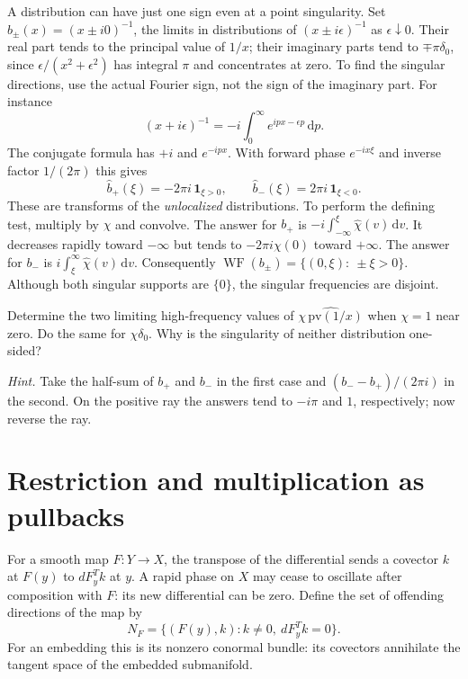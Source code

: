 A distribution can have just one sign even at a point singularity.
Set $b_\pm(x)=(x\pm i0)^{-1}$, the limits in distributions of
$(x\pm i\epsilon)^{-1}$ as $\epsilon\downarrow0$. Their real part tends
to the principal value of $1/x$; their imaginary parts tend to
$\mp\pi\delta_0$, since $\epsilon/(x^2+\epsilon^2)$ has integral $\pi$
and concentrates at zero. To find the singular directions, use the actual
Fourier sign, not the sign of the imaginary part. For instance
\[
  (x+i\epsilon)^{-1}=-i\int_0^\infty e^{ipx-\epsilon p}\,\mathrm{d}p.
\]
The conjugate formula has $+i$ and $e^{-ipx}$. With forward phase
$e^{-ix\xi}$ and inverse factor $1/(2\pi)$ this gives
\begin{equation}
 \widehat b_+(\xi)=-2\pi i\,\mathbf 1_{\xi>0},\qquad
 \widehat b_-(\xi)= 2\pi i\,\mathbf 1_{\xi<0} .
 \label{f:wf-bv}
\end{equation}
These are transforms of the \emph{unlocalized} distributions. To perform
the defining test, multiply by $\chi$ and convolve. The answer for $b_+$
is $-i\int_{-\infty}^\xi\widehat\chi(v)\,\mathrm{d}v$. It decreases
rapidly toward $-\infty$ but tends to $-2\pi i\chi(0)$ toward $+\infty$.
The answer for $b_-$ is $i\int_\xi^\infty\widehat\chi(v)\,\mathrm{d}v$.
Consequently $\operatorname{WF}(b_\pm)=\{(0,\xi):\ \pm\xi>0\}$. Although
both singular supports are $\{0\}$, the singular frequencies are disjoint.

\begin{exercise}
Determine the two limiting high-frequency values of
$\widehat{\chi\,\mathrm{pv}(1/x)}$ when $\chi=1$ near zero. Do the same
for $\chi\delta_0$. Why is the singularity of neither distribution
one-sided?
\end{exercise}
\noindent\emph{Hint.} Take the half-sum of $b_+$ and $b_-$ in the first
case and $(b_--b_+)/(2\pi i)$ in the second. On the positive ray the
answers tend to $-i\pi$ and $1$, respectively; now reverse the ray.

\section{Restriction and multiplication as pullbacks}
For a smooth map $F:Y\to X$, the transpose of the differential sends a
covector $k$ at $F(y)$ to $dF_y^T k$ at $y$. A rapid phase on $X$ may
cease to oscillate after composition with $F$: its new differential can
be zero. Define the set of offending directions of the map by
\[
 N_F=\{(F(y),k):k\ne0,\ dF_y^Tk=0\}.
\]
For an embedding this is its nonzero conormal bundle: its covectors
annihilate the tangent space of the embedded submanifold.

